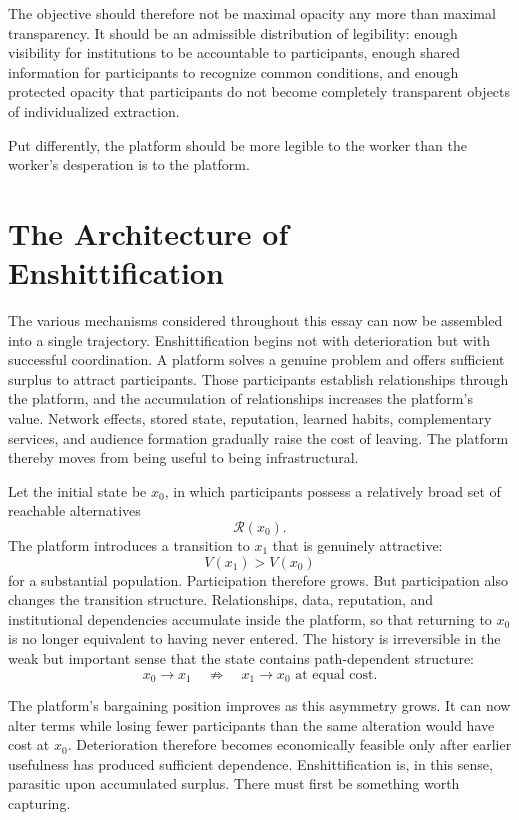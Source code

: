 \documentclass[11pt]{article}
\begin{document}
The objective should therefore not be maximal opacity any more than maximal transparency. It should be an admissible distribution of legibility: enough visibility for institutions to be accountable to participants, enough shared information for participants to recognize common conditions, and enough protected opacity that participants do not become completely transparent objects of individualized extraction.

Put differently, the platform should be more legible to the worker than the worker's desperation is to the platform.

\section{The Architecture of Enshittification}

The various mechanisms considered throughout this essay can now be assembled into a single trajectory. Enshittification begins not with deterioration but with successful coordination. A platform solves a genuine problem and offers sufficient surplus to attract participants. Those participants establish relationships through the platform, and the accumulation of relationships increases the platform's value. Network effects, stored state, reputation, learned habits, complementary services, and audience formation gradually raise the cost of leaving. The platform thereby moves from being useful to being infrastructural.

Let the initial state be \(x_0\), in which participants possess a relatively broad set of reachable alternatives
\[
\mathcal{R}(x_0).
\]
The platform introduces a transition to \(x_1\) that is genuinely attractive:
\[
V(x_1)>V(x_0)
\]
for a substantial population. Participation therefore grows. But participation also changes the transition structure. Relationships, data, reputation, and institutional dependencies accumulate inside the platform, so that returning to \(x_0\) is no longer equivalent to having never entered. The history is irreversible in the weak but important sense that the state contains path-dependent structure:
\[
x_0 \rightarrow x_1
\quad\not\Rightarrow\quad
x_1 \rightarrow x_0
\text{ at equal cost}.
\]

The platform's bargaining position improves as this asymmetry grows. It can now alter terms while losing fewer participants than the same alteration would have cost at \(x_0\). Deterioration therefore becomes economically feasible only after earlier usefulness has produced sufficient dependence. Enshittification is, in this sense, parasitic upon accumulated surplus. There must first be something worth capturing.
\end{document}
